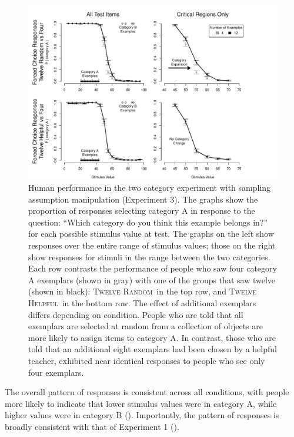 \documentclass[doc,apacite]{apa6}
\newcommand{\random}{\textsc{Twelve Random}}
\newcommand{\helpful}{\textsc{Twelve Helpful}}
\begin{document}
\begin{figure}[htbp]
\includegraphics[width=1.0\textwidth]{figures/two_cat_sampling_results.pdf}
\vspace{-1mm}
\caption{%
Human performance in the two category experiment with sampling assumption
manipulation (Experiment 3).
%
The graphs show the proportion of responses
selecting category A in response to the question: ``Which category do you think
this example belongs in?'' for each possible stimulus value at test.
%
The graphs on the left show responses over the entire range of stimulus values;
those on the right show responses for stimuli in the range between the two
categories.
%
Each row contrasts the performance of people who saw four category A exemplars
(shown in gray) with one of the groups that saw
twelve (shown in black): \random\ in the top row, and \helpful\ in the bottom row.
%
The effect of additional exemplars differs depending on
condition. People who are told that all exemplars are
selected at random from a collection of objects are more likely to assign items to
category A. In contrast, those who are told that an additional eight exemplars had been chosen by a
helpful teacher, exhibited near identical responses to people who see only four
exemplars.
}
\label{fig:exp3-results}
\end{figure}

The overall pattern of responses is consistent across all conditions, with
people more likely to indicate that lower stimulus values were in category A,
while higher values were in category B (). Importantly, the pattern of responses is broadly consistent with that of Experiment 1 ().
%
\end{document}
